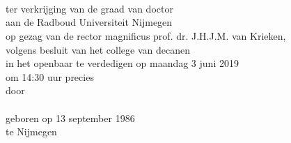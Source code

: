 \newpage

\thispagestyle{empty}
\vspace*{4em}
\begin{center}
\huge{}\\
\huge{}\\[9em]
\normalsize





{\Large\scshape{}}\\[2.5em]


ter verkrijging van de graad van doctor\\
aan de Radboud Universiteit Nijmegen\\
op gezag van de rector magnificus prof. dr. J.H.J.M. van Krieken,\\
volgens besluit van het college van decanen\\
in het openbaar te verdedigen op maandag 3 juni 2019\\
om 14:30 uur precies\\[1.5em]

door\\[1.5em]

{\Large\scshape{}}\\[1.5em]

geboren op 13 september 1986\\
te Nijmegen
\end{center}
\newpage
\thispagestyle{empty}

\noindent

